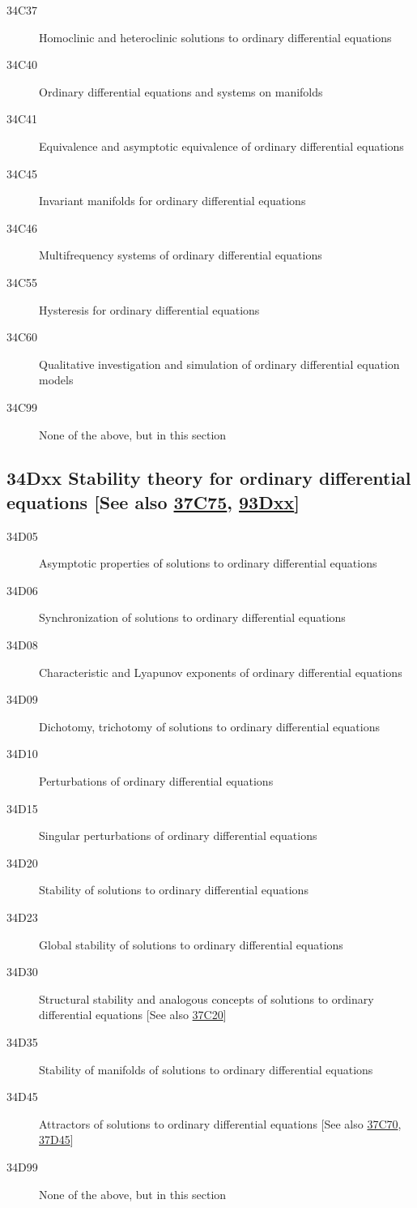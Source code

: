 \documentclass[letterpaper]{article}
\begin{document}
\begin{description}
\item [34C37]\label{34C37} Homoclinic and heteroclinic solutions to ordinary differential equations
\item [34C40]\label{34C40} Ordinary differential equations and systems on manifolds
\item [34C41]\label{34C41} Equivalence and  asymptotic equivalence of ordinary differential equations
\item [34C45]\label{34C45} Invariant manifolds for ordinary differential equations
\item [34C46]\label{34C46} Multifrequency systems of ordinary differential equations
\item [34C55]\label{34C55} Hysteresis for ordinary differential equations
\item [34C60]\label{34C60} Qualitative investigation and simulation of ordinary differential equation models
\item [34C99]\label{34C99} None of the above, but in this section
\end{description}
\subsection*{34Dxx  Stability theory for ordinary differential equations [See also \hyperref[37C75]{37C75}, \hyperref[93Dxx]{93Dxx}] }\label{34Dxx}
\begin{description}  
\item [34D05]\label{34D05} Asymptotic properties of solutions to ordinary differential equations
\item [34D06]\label{34D06} Synchronization of solutions to ordinary differential equations
\item [34D08]\label{34D08} Characteristic and Lyapunov exponents of ordinary differential equations
\item [34D09]\label{34D09} Dichotomy, trichotomy of solutions to ordinary differential equations
\item [34D10]\label{34D10} Perturbations of ordinary differential equations
\item [34D15]\label{34D15} Singular perturbations of ordinary differential equations
\item [34D20]\label{34D20} Stability of solutions to ordinary differential equations
\item [34D23]\label{34D23} Global stability of solutions to ordinary differential equations
\item [34D30]\label{34D30} Structural stability and analogous concepts of solutions to ordinary differential equations [See also \hyperref[37C20]{37C20}]
\item [34D35]\label{34D35} Stability of manifolds of solutions to ordinary differential equations
\item [34D45]\label{34D45} Attractors of solutions to ordinary differential equations [See also \hyperref[37C70]{37C70}, \hyperref[37D45]{37D45}]
\item [34D99]\label{34D99} None of the above, but in this section
\end{description}
\end{document}
